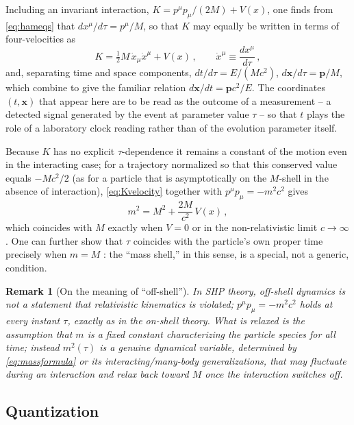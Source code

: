 \documentclass[11pt]{article}
\newtheorem{remark}{Remark}[section]
\begin{document}
Including an invariant interaction, $K=p^\mu p_\mu/(2M)+V(x)$, one finds from
\eqref{eq:hameqs} that $dx^\mu/d\tau=p^\mu/M$, so that $K$ may equally be
written in terms of four-velocities as
\begin{equation}
K=\tfrac{1}{2}M\,\dot x_\mu \dot x^\mu+V(x)\,,\qquad \dot x^\mu\equiv \frac{dx^\mu}{d\tau}\,,
\label{eq:Kvelocity}
\end{equation}
and, separating time and space components,
$dt/d\tau=E/(Mc^2)$, $d\bm x/d\tau=\bm p/M$, which combine to give the familiar
relation $d\bm x/dt=\bm p c^2/E$. The coordinates $(t,\bm x)$ that appear here
are to be read as the outcome of a measurement -- a detected signal generated
by the event at parameter value $\tau$ -- so that $t$ plays the role of a
laboratory clock reading rather than of the evolution parameter itself.

Because $K$ has no explicit $\tau$-dependence it remains a constant of the
motion even in the interacting case; for a trajectory normalized so that this
conserved value equals $-Mc^2/2$ (as for a particle that is asymptotically on
the $M$-shell in the absence of interaction), \eqref{eq:Kvelocity} together with
$p^\mu p_\mu=-m^2c^2$ gives
\begin{equation}
m^2=M^2+\frac{2M}{c^2}\,V(x)\,,
\label{eq:massformula}
\end{equation}
which coincides with $M$ exactly when $V=0$ or in the non-relativistic limit
$c\to\infty$. One can further show that $\tau$ coincides with the particle's
own proper time precisely when $m=M$
\cite{HorwitzPiron1973,Horwitz2015}: the ``mass shell,'' in this sense, is a
special, not a generic, condition.

\begin{remark}[On the meaning of ``off-shell'']
In SHP theory, off-shell dynamics is not a statement that relativistic
kinematics is violated; $p^\mu p_\mu=-m^2c^2$ holds at every instant $\tau$,
exactly as in the on-shell theory. What is relaxed is the assumption that $m$
is a fixed constant characterizing the particle species for all time; instead
$m^2(\tau)$ is a genuine dynamical variable, determined by \eqref{eq:massformula}
or its interacting/many-body generalizations, that may fluctuate during an
interaction and relax back toward $M$ once the interaction switches off.
\end{remark}

\subsection{Quantization}
\end{document}
